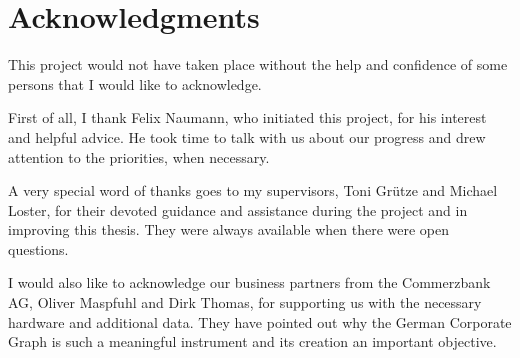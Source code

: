 \section*{Acknowledgments}
This project would not have taken place without the help and confidence of some persons that I would like to acknowledge.

First of all, I thank Felix Naumann, who initiated this project, for his interest and helpful advice. He took time to talk with us about our progress and drew attention to the priorities, when necessary.

A very special word of thanks goes to my supervisors, Toni Grütze and Michael Loster, for their devoted guidance and assistance during the project and in improving this thesis. They were always available when there were open questions.

I would also like to acknowledge our business partners from the Commerzbank AG, Oliver Maspfuhl and Dirk Thomas, for supporting us with the necessary hardware and additional data. They have pointed out why the German Corporate Graph is such a meaningful instrument and its creation an important objective.